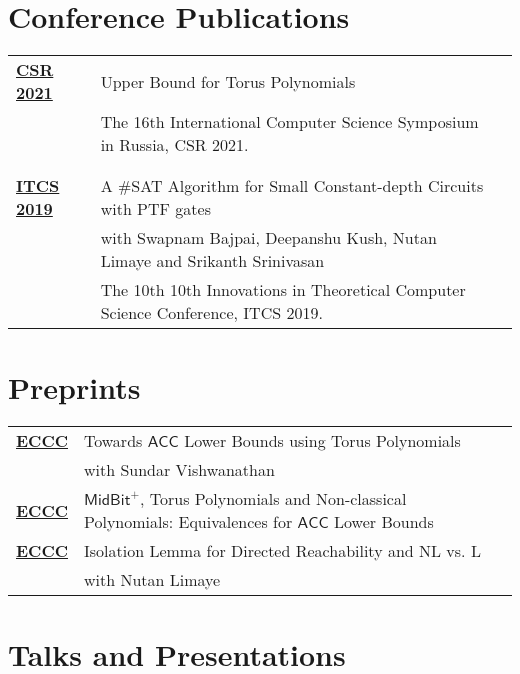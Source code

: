 \documentclass[a4paper,10pt]{article}
\begin{document}
\section{Conference Publications}

\begin{tabular}{p{2.5cm}|p{11cm}l}
  \href{https://link.springer.com/chapter/10.1007/978-3-030-79416-3_15}{{\bf CSR 2021}} & Upper Bound for Torus Polynomials \\
  & The 16th International Computer Science Symposium in Russia, CSR 2021. \\\multicolumn{2}{c}{} \\
  \\
  \href{https://drops.dagstuhl.de/opus/volltexte/2018/10101/}{{\bf ITCS 2019}} & A \#SAT Algorithm for Small Constant-depth Circuits with PTF gates \\
  & with Swapnam Bajpai, Deepanshu Kush, Nutan Limaye and Srikanth Srinivasan \\
  & The 10th 10th Innovations in Theoretical Computer Science Conference, ITCS 2019.
\end{tabular}

\section{Preprints}

\begin{tabular}{p{2.5cm}|p{11cm}l}
  \href{https://eccc.weizmann.ac.il/report/2024/074/}{{\bf ECCC}} & Towards \(\mathsf{ACC}\) Lower Bounds using Torus Polynomials \\
                                                                  & with Sundar Vishwanathan \\
  \href{https://eccc.weizmann.ac.il/report/2023/111/}{{\bf ECCC}} & \(\mathsf{MidBit}^+\), Torus Polynomials and Non-classical Polynomials: Equivalences for \(\mathsf{ACC}\) Lower Bounds \\
  \href{https://eccc.weizmann.ac.il/report/2016/155/}{{\bf ECCC}} & Isolation Lemma for Directed Reachability and NL vs. L
  \\
  & with Nutan Limaye
\end{tabular}

\section{Talks and Presentations}
\end{document}
